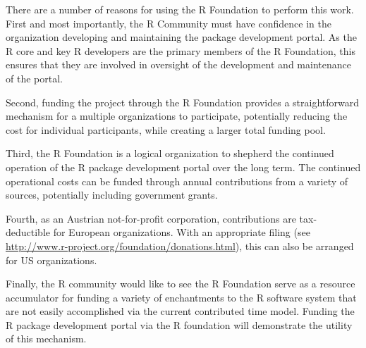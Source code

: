 \documentclass[12pt]{article}
\begin{document}
There are a number of reasons for using the R Foundation to
perform this work.  First and most importantly, the R Community
must have confidence in the organization developing and
maintaining the package development portal.  As the R core and key
R developers are the primary members of the R Foundation, this
ensures that they are involved in oversight of the development and
maintenance of the portal.

Second, funding the project through the R Foundation provides a
straightforward mechanism for a multiple organizations to
participate, potentially reducing the cost for individual
participants, while creating a larger total funding pool.

Third, the R Foundation is a logical organization to shepherd the
continued operation of the R package development portal over the
long term.  The continued operational costs can be funded through
annual contributions from a variety of sources, potentially
including government grants.

Fourth, as an Austrian not-for-profit corporation, contributions
are tax-deductible for European organizations.  With an
appropriate filing (see
\url{http://www.r-project.org/foundation/donations.html}),
 this can also be arranged for US organizations.

Finally, the R community would like to see the R Foundation serve
as a resource accumulator for funding a variety of enchantments to
the R software system that are not easily accomplished via the
current contributed time model.  Funding the R package development
portal via the R foundation will demonstrate the utility of this
mechanism.
\end{document}
